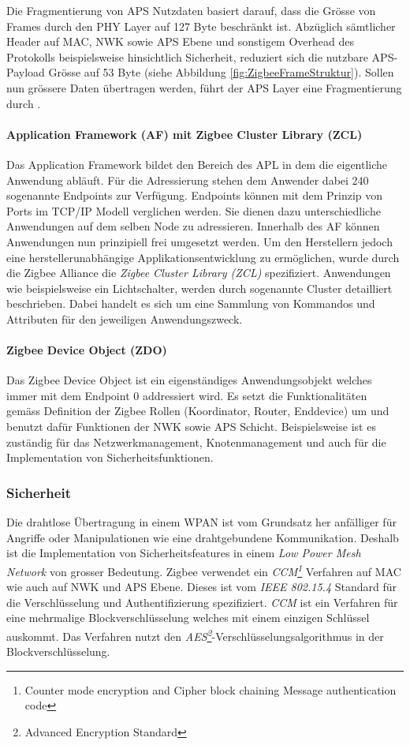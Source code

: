 Die Fragmentierung von APS Nutzdaten basiert darauf, dass die Grösse von Frames durch den PHY Layer auf 127 Byte beschränkt ist.
Abzüglich sämtlicher Header auf MAC, NWK sowie APS Ebene und sonstigem Overhead des Protokolls beispielsweise hinsichtlich Sicherheit, reduziert sich die nutzbare APS-Payload Grösse auf 53 Byte (siehe Abbildung \ref{fig:ZigbeeFrameStruktur}).
Sollen nun grössere Daten übertragen werden, führt der APS Layer eine Fragmentierung durch \cite[S.~279 - 299]{markus_krause_rainer_konrad_zigbee_2014}.


\paragraph{Application Framework (AF) mit Zigbee Cluster Library (ZCL)}
Das Application Framework bildet den Bereich des APL in dem die eigentliche Anwendung abläuft. Für die Adressierung stehen dem Anwender dabei 240 sogenannte Endpoints zur Verfügung. Endpoints können mit dem Prinzip von Ports im TCP/IP Modell verglichen werden.
Sie dienen dazu unterschiedliche Anwendungen auf dem selben Node zu adressieren.
Innerhalb des AF können Anwendungen nun prinzipiell frei umgesetzt werden.
Um den Herstellern jedoch eine herstellerunabhängige Applikationsentwicklung zu ermöglichen, wurde durch die Zigbee Alliance die \textit{Zigbee Cluster Library (ZCL)} spezifiziert.
Anwendungen wie beispielsweise ein Lichtschalter, werden durch sogenannte Cluster detailliert beschrieben.
Dabei handelt es sich um eine Sammlung von Kommandos und Attributen für den jeweiligen Anwendungszweck.\cite{the_zigbee_alliance_zigbee_2016}

\paragraph{Zigbee Device Object (ZDO)}
Das Zigbee Device Object ist ein eigenständiges Anwendungsobjekt welches immer mit dem Endpoint 0 addressiert wird.
Es setzt die Funktionalitäten gemäss Definition der Zigbee Rollen (Koordinator, Router, Enddevice) um und benutzt dafür Funktionen der NWK sowie APS Schicht.
Beispielsweise ist es zuständig für das Netzwerkmanagement, Knotenmanagement und auch für die Implementation von Sicherheitsfunktionen.

\subsubsection{Sicherheit}\label{subsucsec:ZigbeeSicherheit}
Die drahtlose Übertragung in einem WPAN ist vom Grundsatz her anfälliger für Angriffe oder Manipulationen wie eine drahtgebun­dene Kommunikation.
Deshalb ist die Implementation von Sicherheitsfeatures in einem \textit{Low Power Mesh Network} von grosser Bedeutung.
Zigbee verwendet ein \textit{CCM\footnote{Counter mode encryption and Cipher block chaining Message authentication code}} Verfahren auf MAC wie auch auf NWK und APS Ebene.
Dieses ist vom \textit{IEEE 802.15.4} Standard für die Verschlüsselung und Authentifizierung spezifiziert.
\textit{CCM} ist ein Verfahren für eine mehrmalige Blockverschlüsselung welches mit einem einzigen Schlüssel auskommt.
Das Verfahren nutzt den \textit{AES\footnote{Advanced Encryption Standard}}-Verschlüsselungsalgorithmus in der Blockverschlüsselung.

